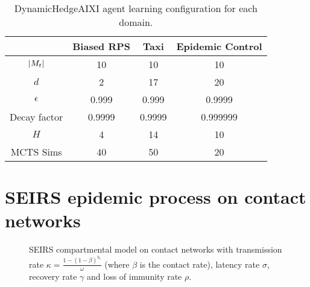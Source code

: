 \begin{center}
    \begin{table}[H]
        \centering
        \begin{tabular}{cccc}
         & Biased RPS & Taxi & Epidemic Control\\
        \hline
        $\lvert M_t \rvert$ & 10 & 10 & 10\\
        $d$ & 2 & 17 & 20 \\
        $\epsilon$ & 0.999 & 0.999 & 0.9999\\
        Decay factor & 0.9999 & 0.9999 & 0.999999\\
        $H$ & 4 & 14 & 10\\
        MCTS Sims & 40 & 50 & 20
        \end{tabular}
        \caption{DynamicHedgeAIXI agent learning configuration for each domain.}
        \label{tab:BCTW_config}
    \end{table}
\end{center}


\section{SEIRS epidemic process on contact networks}
\label{appendix:SEIRS_dynamics}

\begin{figure}[H]
    \centering
    \caption{SEIRS compartmental model on contact networks with transmission rate $\kappa = \frac{1-(1-\beta)^{k_t}}{\omega}$ (where $\beta$ is the contact rate), latency rate $\sigma$, recovery rate $\gamma$ and loss of immunity rate $\rho$. }
    \label{fig:epi}
\end{figure}

